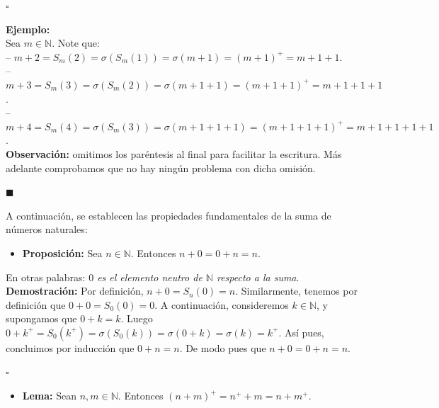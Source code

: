 \documentclass[10 pt]{article}
\begin{document}
\begin{flushright}
    $\square$
\end{flushright}

\Large{\textbf{Ejemplo:}} \\

\Large{Sea $m \in \mathbb N$. Note que: \\

-- $m+2=S_m(2)=\sigma(S_m(1))=\sigma(m+1)=(m+1)^+=m+1+1$. \\

-- $m+3=S_m(3)=\sigma(S_m(2))=\sigma(m+1+1)=(m+1+1)^+=m+1+1+1$. \\

-- $m+4=S_m(4)=\sigma(S_m(3))=\sigma(m+1+1+1)=(m+1+1+1)^+=m+1+1+1+1$.} \\

\Large{\textbf{Observación:} omitimos los paréntesis al final para facilitar la escritura. Más adelante comprobamos que no hay ningún problema con dicha omisión.} \\

\begin{flushright}
    $\blacksquare$
\end{flushright}

\Large{A continuación, se establecen las propiedades fundamentales de la suma de números naturales:} \\

\begin{itemize}
    \item \Large{\textbf{Proposición:} Sea $n \in \mathbb N$. Entonces $n+0=0+n=n$.} \\
\end{itemize}

\Large{En otras palabras: \textit{$0$ es el elemento neutro de $\mathbb N$ respecto a la suma}.} \\

\Large{\textbf{Demostración:} Por definición, $n+0=S_n(0)=n$. Similarmente, tenemos por definición que $0+0=S_0(0)=0$. A continuación, consideremos $k \in \mathbb N$, y supongamos que $0+k=k$. Luego $0+k^+=S_0(k^+)=\sigma(S_0(k))=\sigma(0+k)=\sigma(k)=k^+$. Así pues, concluimos por inducción que $0+n=n$. De modo pues que $n+0=0+n=n$.} \\

\begin{flushright}
    $\square$
\end{flushright}

\begin{itemize}
    \item \Large{\textbf{Lema:} Sean $n,m \in \mathbb N$. Entonces $(n+m)^+=n^++m=n+m^+$.} \\
\end{itemize}
\end{document}
